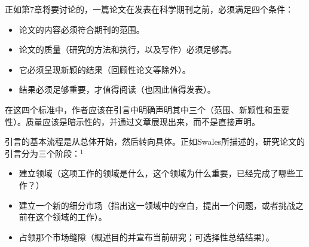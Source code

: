 正如第7章将要讨论的，一篇论文在发表在科学期刊之前，必须满足四个条件：

\begin{itemize}
\item 论文的内容必须符合期刊的范围。
\item 论文的质量（研究的方法和执行，以及写作）必须足够高。
\item 它必须呈现新颖的结果（回顾性论文等除外）。
\item 结果必须足够重要，才值得阅读（也因此值得发表）。
\end{itemize}

在这四个标准中，作者应该在引言中明确声明其中三个（范围、新颖性和重要性）。质量应该是暗示性的，并通过文章展现出来，而不是直接声明。

引言的基本流程是从总体开始，然后转向具体。正如Swales所描述的，研究论文的引言分为三个阶段：${ }^{1}$

\begin{itemize}
\item 建立领域（这项工作的领域是什么，这个领域为什么重要，已经完成了哪些工作？）
\item 建立一个新的细分市场（指出这一领域中的空白，提出一个问题，或者挑战之前在这个领域的工作）。
\item 占领那个市场缝隙（概述目的并宣布当前研究；可选择性总结结果）。
\end{itemize}

